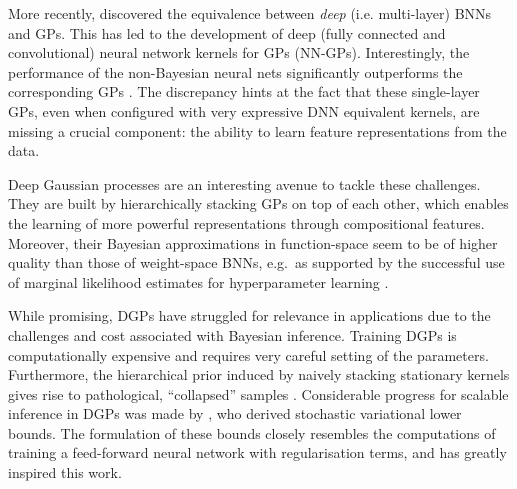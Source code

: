 More recently, \citet{matthews2018gaussian} discovered the equivalence between \emph{deep} (i.e. multi-layer) BNNs and GPs. This has led to the development of deep (fully connected and convolutional) neural network kernels for GPs (NN-GPs). Interestingly, the performance of the non-Bayesian neural nets significantly outperforms the corresponding GPs \citep{garriga2018deep,novak2018bayesian}. The discrepancy hints at the fact that these single-layer GPs, even when configured with very expressive DNN equivalent kernels, are missing a crucial component: the ability to learn feature representations from the data.

Deep Gaussian processes \citep[DGPs]{Damianou2013} are an interesting avenue to tackle these challenges. They are built by hierarchically stacking GPs on top of each other, which enables the learning of more powerful representations through compositional features. Moreover, their Bayesian approximations in function-space seem to be of higher quality than those of weight-space BNNs, e.g.~as supported by the successful use of marginal likelihood estimates for hyperparameter learning \citep{Damianou2013}.

While promising, DGPs have struggled for relevance in applications due to the challenges and cost associated with Bayesian inference. Training DGPs is computationally expensive and requires very careful setting of the parameters. Furthermore, the hierarchical prior induced by naively stacking stationary kernels gives rise to pathological, ``collapsed'' samples \citet{duvenaud2014avoiding}. Considerable progress for scalable inference in DGPs was made by \citet{hensman2014nested, salimbeni2017doubly}, who derived stochastic variational lower bounds. The formulation of these bounds closely resembles the computations of training a feed-forward neural network with regularisation terms, and has greatly inspired this work.


